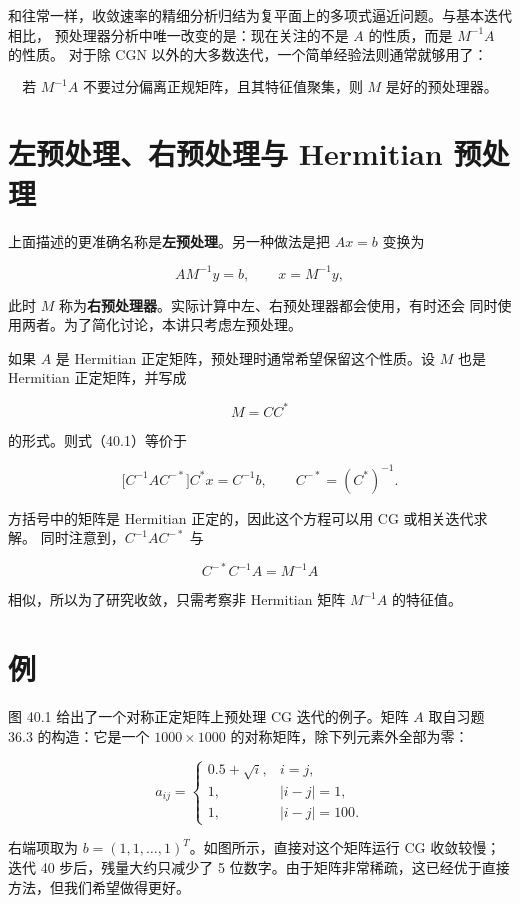 \documentclass[UTF8,fontset=none,12pt]{ctexart}
\begin{document}
和往常一样，收敛速率的精细分析归结为复平面上的多项式逼近问题。与基本迭代相比，
预处理器分析中唯一改变的是：现在关注的不是 $A$ 的性质，而是 $M^{-1}A$ 的性质。
对于除 CGN 以外的大多数迭代，一个简单经验法则通常就够用了：

\[
\boxed{\text{若 }M^{-1}A\text{ 不要过分偏离正规矩阵，且其特征值聚集，则 }M\text{ 是好的预处理器。}}
\]

\section*{左预处理、右预处理与 Hermitian 预处理}

上面描述的更准确名称是\textbf{左预处理}。另一种做法是把
$Ax=b$ 变换为

\[
AM^{-1}y=b,\qquad x=M^{-1}y,
\]

此时 $M$ 称为\textbf{右预处理器}。实际计算中左、右预处理器都会使用，有时还会
同时使用两者。为了简化讨论，本讲只考虑左预处理。

如果 $A$ 是 Hermitian 正定矩阵，预处理时通常希望保留这个性质。设 $M$ 也是
Hermitian 正定矩阵，并写成

\[
M=CC^*
\]

的形式。则式（40.1）等价于

\begin{equation}
\bigl[C^{-1}AC^{-*}\bigr]C^*x=C^{-1}b,
\qquad C^{-*}=(C^*)^{-1}.
\tag{40.4}
\end{equation}

方括号中的矩阵是 Hermitian 正定的，因此这个方程可以用 CG 或相关迭代求解。
同时注意到，$C^{-1}AC^{-*}$ 与

\[
C^{-*}C^{-1}A=M^{-1}A
\]

相似，所以为了研究收敛，只需考察非 Hermitian 矩阵 $M^{-1}A$ 的特征值。

\section*{例}

图 40.1 给出了一个对称正定矩阵上预处理 CG 迭代的例子。矩阵 $A$ 取自习题 36.3
的构造：它是一个 $1000\times1000$ 的对称矩阵，除下列元素外全部为零：

\[
a_{ij}=
\begin{cases}
0.5+\sqrt{i}, & i=j,\\
1, & |i-j|=1,\\
1, & |i-j|=100.
\end{cases}
\]

右端项取为 $b=(1,1,\ldots,1)^T$。如图所示，直接对这个矩阵运行 CG 收敛较慢；
迭代 40 步后，残量大约只减少了 5 位数字。由于矩阵非常稀疏，这已经优于直接
方法，但我们希望做得更好。
\end{document}
